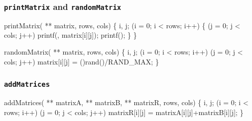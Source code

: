 \documentclass[smaller,handout,table]{beamer}
\begin{document}
\begin{frame}[fragile]
\frametitle{{\tt printMatrix} and {\tt randomMatrix}}
\begin{semiverbatim}
\scriptsize
\kr\kl{} printMatrix( ** matrix,  rows,
\kl                                   {} cols)
\kl\{
\kl   {} i, j;
\kl
\kl   {} (i = 0; i < rows; i++)
\kl   \{
\kl      {} (j = 0; j < cols; j++)
\kl         printf(, matrix[i][j]);
\kl      printf();
\kl   \}
\kl\}
\end{semiverbatim}

\begin{semiverbatim}
\scriptsize
\kr\kl{} randomMatrix( ** matrix,  rows,
\kl                                    {} cols)
\kl\{
\kl   {} i, j;
\kl   {} (i = 0; i < rows; i++)
\kl      {} (j = 0; j < cols; j++)
\kl         matrix[i][j] = ()rand()/RAND_MAX;
\kl\}
\end{semiverbatim}
\end{frame}

\begin{frame}[fragile]
\frametitle{{\tt addMatrices}}
\begin{semiverbatim}
\scriptsize
\kr\kl{} addMatrices( ** matrixA,  ** matrixB,
\kl                 {} ** matrixR,
\kl                 {} rows,  cols)
\kl\{
\kl   {} i, j;
\kl   {} (i = 0; i < rows; i++)
\kl      {} (j = 0; j < cols; j++)
\kl         matrixR[i][j] = matrixA[i][j]+matrixB[i][j];
\kl\}
\end{semiverbatim}
\end{frame}
\end{document}
